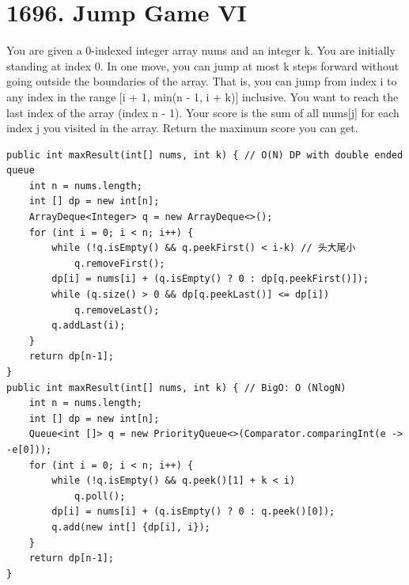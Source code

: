 \documentclass[9pt, b5paaper]{book}
\begin{document}
\section{1696. Jump Game VI}
\label{sec-8-2}
You are given a 0-indexed integer array nums and an integer k.
You are initially standing at index 0. In one move, you can jump at most k steps forward without going outside the boundaries of the array. That is, you can jump from index i to any index in the range [i + 1, min(n - 1, i + k)] inclusive.
You want to reach the last index of the array (index n - 1). Your score is the sum of all nums[j] for each index j you visited in the array.
Return the maximum score you can get.
\begin{verbatim}
public int maxResult(int[] nums, int k) { // O(N) DP with double ended queue
    int n = nums.length;
    int [] dp = new int[n];
    ArrayDeque<Integer> q = new ArrayDeque<>();
    for (int i = 0; i < n; i++) {
        while (!q.isEmpty() && q.peekFirst() < i-k) // 头大尾小
            q.removeFirst();
        dp[i] = nums[i] + (q.isEmpty() ? 0 : dp[q.peekFirst()]);
        while (q.size() > 0 && dp[q.peekLast()] <= dp[i])
            q.removeLast();
        q.addLast(i);
    }
    return dp[n-1];
}
public int maxResult(int[] nums, int k) { // BigO: O (NlogN)
    int n = nums.length;
    int [] dp = new int[n];
    Queue<int []> q = new PriorityQueue<>(Comparator.comparingInt(e -> -e[0]));
    for (int i = 0; i < n; i++) {
        while (!q.isEmpty() && q.peek()[1] + k < i)
            q.poll();
        dp[i] = nums[i] + (q.isEmpty() ? 0 : q.peek()[0]);
        q.add(new int[] {dp[i], i});
    }
    return dp[n-1];
}
\end{verbatim}
\end{document}
